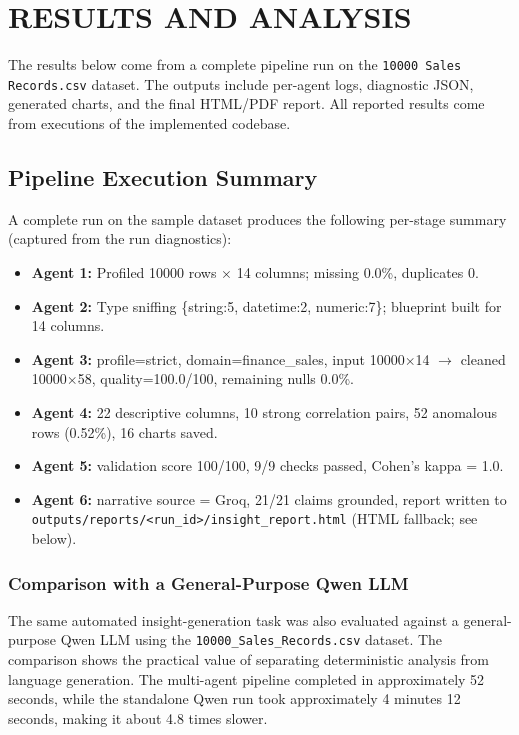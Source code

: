 \documentclass[12pt,a4paper,openany]{report}
\begin{document}
\chapter{RESULTS AND ANALYSIS}

The results below come from a complete pipeline run on the \texttt{10000 Sales Records.csv} dataset. The outputs include per-agent logs, diagnostic JSON, generated charts, and the final HTML/PDF report. All reported results come from executions of the implemented codebase.

\section{Pipeline Execution Summary}

A complete run on the sample dataset produces the following per-stage summary (captured from the run diagnostics):

\begin{itemize}
	\item \textbf{Agent 1:} Profiled 10000 rows $\times$ 14 columns; missing 0.0\%, duplicates 0.
	\item \textbf{Agent 2:} Type sniffing \{string:5, datetime:2, numeric:7\}; blueprint built for 14 columns.
	\item \textbf{Agent 3:} profile=strict, domain=finance\_sales, input 10000$\times$14 $\rightarrow$ cleaned 10000$\times$58, quality=100.0/100, remaining nulls 0.0\%.
	\item \textbf{Agent 4:} 22 descriptive columns, 10 strong correlation pairs, 52 anomalous rows (0.52\%), 16 charts saved.
	\item \textbf{Agent 5:} validation score 100/100, 9/9 checks passed, Cohen's kappa = 1.0.
	\item \textbf{Agent 6:} narrative source = Groq, 21/21 claims grounded, report written to \texttt{outputs/reports/<run\_id>/insight\_report.html} (HTML fallback; see below).
\end{itemize}

\subsection{Comparison with a General-Purpose Qwen LLM}

The same automated insight-generation task was also evaluated against a general-purpose Qwen LLM using the \texttt{10000\_Sales\_Records.csv} dataset. The comparison shows the practical value of separating deterministic analysis from language generation. The multi-agent pipeline completed in approximately 52 seconds, while the standalone Qwen run took approximately 4 minutes 12 seconds, making it about 4.8 times slower.
\end{document}
